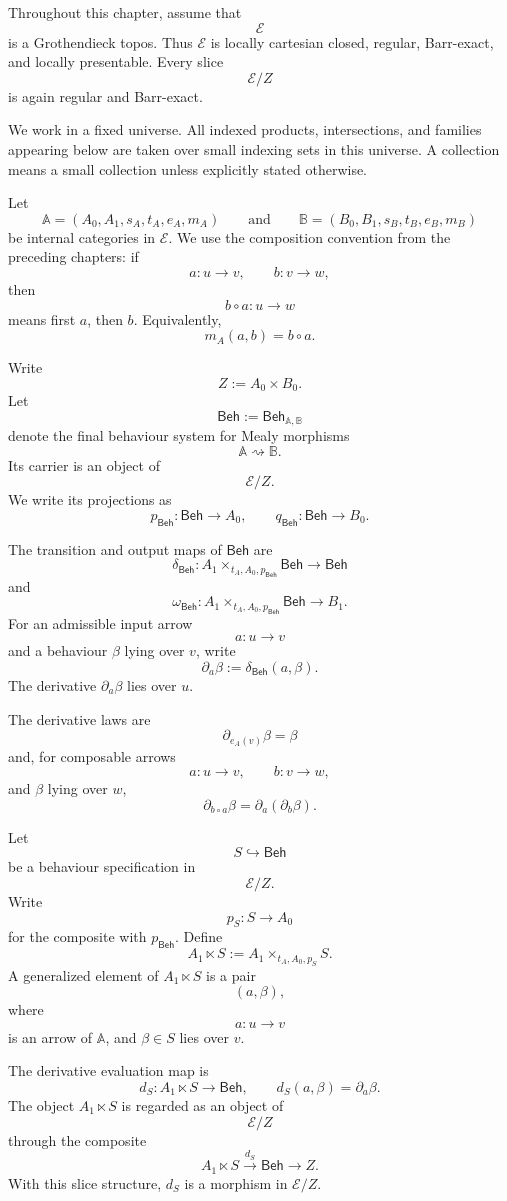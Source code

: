 Throughout this chapter, assume that
\[
\mathcal E
\]
is a Grothendieck topos. Thus \(\mathcal E\) is locally cartesian closed,
regular, Barr-exact, and locally presentable. Every slice
\[
\mathcal E/Z
\]
is again regular and Barr-exact.

We work in a fixed universe. All indexed products, intersections, and
families appearing below are taken over small indexing sets in this universe.
A collection means a small collection unless explicitly stated otherwise.

Let
\[
\mathbb A
=
(A_0,A_1,s_A,t_A,e_A,m_A)
\qquad\text{and}\qquad
\mathbb B
=
(B_0,B_1,s_B,t_B,e_B,m_B)
\]
be internal categories in \(\mathcal E\). We use the composition convention
from the preceding chapters: if
\[
a:u\to v,
\qquad
b:v\to w,
\]
then
\[
b\circ a:u\to w
\]
means first \(a\), then \(b\). Equivalently,
\[
m_A(a,b)=b\circ a.
\]

Write
\[
Z:=A_0\times B_0.
\]
Let
\[
\mathsf{Beh}
:=
\mathsf{Beh}_{\mathbb A,\mathbb B}
\]
denote the final behaviour system for Mealy morphisms
\[
\mathbb A\rightsquigarrow\mathbb B.
\]
Its carrier is an object of
\[
\mathcal E/Z.
\]
We write its projections as
\[
p_{\mathsf{Beh}}:\mathsf{Beh}\to A_0,
\qquad
q_{\mathsf{Beh}}:\mathsf{Beh}\to B_0.
\]

The transition and output maps of \(\mathsf{Beh}\) are
\[
\delta_{\mathsf{Beh}}:
A_1\times_{t_A,A_0,p_{\mathsf{Beh}}}\mathsf{Beh}
\to
\mathsf{Beh}
\]
and
\[
\omega_{\mathsf{Beh}}:
A_1\times_{t_A,A_0,p_{\mathsf{Beh}}}\mathsf{Beh}
\to
B_1.
\]
For an admissible input arrow
\[
a:u\to v
\]
and a behaviour \(\beta\) lying over \(v\), write
\[
\partial_a\beta
:=
\delta_{\mathsf{Beh}}(a,\beta).
\]
The derivative \(\partial_a\beta\) lies over \(u\).

The derivative laws are
\[
\partial_{e_A(v)}\beta=\beta
\]
and, for composable arrows
\[
a:u\to v,
\qquad
b:v\to w,
\]
and \(\beta\) lying over \(w\),
\[
\partial_{b\circ a}\beta
=
\partial_a(\partial_b\beta).
\]

Let
\[
S\hookrightarrow\mathsf{Beh}
\]
be a behaviour specification in
\[
\mathcal E/Z.
\]
Write
\[
p_S:S\to A_0
\]
for the composite with \(p_{\mathsf{Beh}}\). Define
\[
A_1\ltimes S
:=
A_1\times_{t_A,A_0,p_S}S.
\]
A generalized element of \(A_1\ltimes S\) is a pair
\[
(a,\beta),
\]
where
\[
a:u\to v
\]
is an arrow of \(\mathbb A\), and \(\beta\in S\) lies over \(v\).

The derivative evaluation map is
\[
d_S:A_1\ltimes S\to\mathsf{Beh},
\qquad
d_S(a,\beta)=\partial_a\beta.
\]
The object \(A_1\ltimes S\) is regarded as an object of
\[
\mathcal E/Z
\]
through the composite
\[
A_1\ltimes S
\xrightarrow{d_S}
\mathsf{Beh}
\to Z.
\]
With this slice structure, \(d_S\) is a morphism in \(\mathcal E/Z\).

